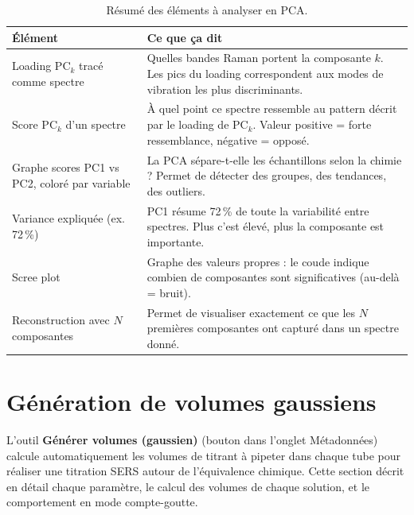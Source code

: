 \documentclass[12pt, a4paper]{article}
\begin{document}
\begin{table}[h!]
  \centering
  \caption{Résumé des éléments à analyser en PCA.}
  \label{tab:pca_summary}
  \begin{tabularx}{\textwidth}{lX}
    \toprule
    \textbf{Élément} & \textbf{Ce que ça dit} \\
    \midrule
    Loading PC$_k$ tracé comme spectre
      & Quelles bandes Raman portent la composante $k$. Les pics du loading
        correspondent aux modes de vibration les plus discriminants. \\
    \addlinespace
    Score PC$_k$ d'un spectre
      & À quel point ce spectre ressemble au pattern décrit par le loading
        de PC$_k$. Valeur positive = forte ressemblance, négative = opposé. \\
    \addlinespace
    Graphe scores PC1 vs PC2, coloré par variable
      & La PCA sépare-t-elle les échantillons selon la chimie ? Permet de
        détecter des groupes, des tendances, des outliers. \\
    \addlinespace
    Variance expliquée (ex. 72\,\%)
      & PC1 résume 72\,\% de toute la variabilité entre spectres. Plus c'est
        élevé, plus la composante est importante. \\
    \addlinespace
    Scree plot
      & Graphe des valeurs propres : le coude indique combien de composantes
        sont significatives (au-delà = bruit). \\
    \addlinespace
    Reconstruction avec $N$ composantes
      & Permet de visualiser exactement ce que les $N$ premières composantes
        ont capturé dans un spectre donné. \\
    \bottomrule
  \end{tabularx}
\end{table}

\section{Génération de volumes gaussiens}
\label{sec:gauss}

L'outil \textbf{Générer volumes (gaussien)} (bouton dans l'onglet Métadonnées)
calcule automatiquement les volumes de titrant à pipeter dans chaque tube pour
réaliser une titration SERS autour de l'équivalence chimique. Cette section
décrit en détail chaque paramètre, le calcul des volumes de chaque solution,
et le comportement en mode compte-goutte.
\end{document}
